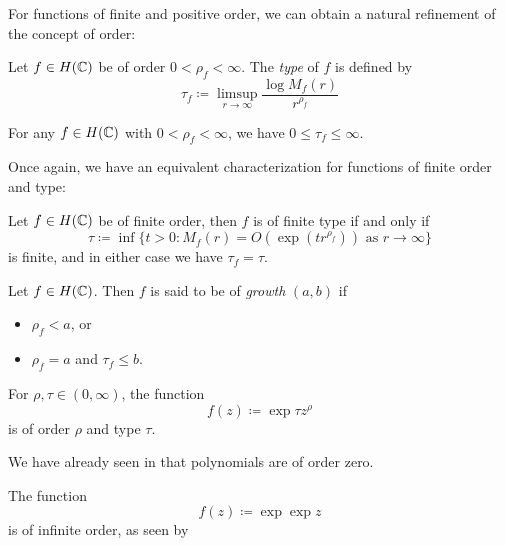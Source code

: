 For functions of finite and positive order, we can obtain a natural refinement of the concept of order:

\begin{definition}
    Let $f \in H(\mathbb{C})$ be of order $0 < \rho_f < \infty$. The \emph{type} of $f$ is defined by
    \begin{equation} \label{eq:def-type}
        \tau_f \coloneqq \limsup_{r \to \infty} \frac{\log M_f(r)}{r^{\rho_f}}
    \end{equation}
\end{definition}

For any $f \in H(\mathbb{C})$ with $0 < \rho_f < \infty$, we have $0 \leq \tau_f \leq \infty$.

Once again, we have an equivalent characterization for functions of finite order and type:

\begin{proposition} \label{prop:type-infimum}
    Let $f \in H(\mathbb{C})$ be of finite order, then $f$ is of finite type if and only if
    \begin{equation}
        \tau \coloneqq \inf \{ t > 0 : M_f(r) = O(\exp (t r^{\rho_f})) \textrm{ as } r \to \infty \}
    \end{equation}
    is finite, and in either case we have $\tau_f = \tau$.
\end{proposition}





\begin{definition}
    Let $f \in H(\mathbb{C})$. Then $f$ is said to be of \emph{growth} $(a, b)$ if
    \begin{itemize}
        \item $\rho_f < a$, or
        \item $\rho_f = a$ and $\tau_f \leq b$.
    \end{itemize}
\end{definition}

\begin{example} \label{exm:order-and-type}
    For $\rho, \tau \in (0, \infty)$, the function
    $$ f(z) \coloneqq \exp {\tau z^\rho} $$
    is of order $\rho$ and type $\tau$.

    We have already seen in  that polynomials are of order zero.

    The function
    $$ f(z) \coloneqq \exp \exp z $$
    is of infinite order, as seen by 
\end{example}